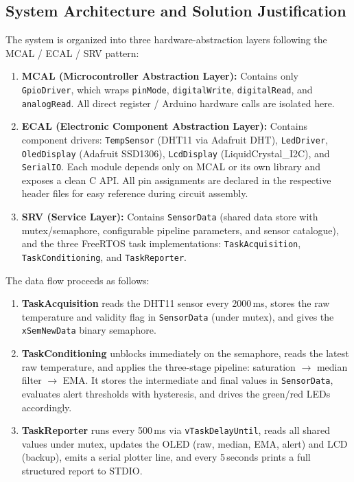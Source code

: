 \subsection{System Architecture and Solution Justification}

The system is organized into three hardware-abstraction layers following the MCAL /
ECAL / SRV pattern:

\begin{enumerate}
  \item \textbf{MCAL (Microcontroller Abstraction Layer):} Contains only
    \texttt{GpioDriver}, which wraps \texttt{pinMode}, \texttt{digitalWrite},
    \texttt{digitalRead}, and \texttt{analogRead}. All direct register / Arduino
    hardware calls are isolated here.
  \item \textbf{ECAL (Electronic Component Abstraction Layer):} Contains component
    drivers: \texttt{TempSensor} (DHT11 via Adafruit DHT), \texttt{LedDriver},
    \texttt{OledDisplay} (Adafruit SSD1306), \texttt{LcdDisplay}
    (LiquidCrystal\_I2C), and \texttt{SerialIO}. Each module depends only on MCAL
    or its own library and exposes a clean C API. All pin assignments are declared
    in the respective header files for easy reference during circuit assembly.
  \item \textbf{SRV (Service Layer):} Contains \texttt{SensorData} (shared data store
    with mutex/semaphore, configurable pipeline parameters, and sensor catalogue),
    and the three FreeRTOS task implementations:
    \texttt{TaskAcquisition}, \texttt{TaskConditioning}, and \texttt{TaskReporter}.
\end{enumerate}

The data flow proceeds as follows:
\begin{enumerate}
  \item \textbf{TaskAcquisition} reads the DHT11 sensor every 2000\,ms, stores the
    raw temperature and validity flag in \texttt{SensorData} (under mutex), and gives
    the \texttt{xSemNewData} binary semaphore.
  \item \textbf{TaskConditioning} unblocks immediately on the semaphore, reads the
    latest raw temperature, and applies the three-stage pipeline: saturation $\to$
    median filter $\to$ EMA. It stores the intermediate and final values in
    \texttt{SensorData}, evaluates alert thresholds with hysteresis, and drives the
    green/red LEDs accordingly.
  \item \textbf{TaskReporter} runs every 500\,ms via \texttt{vTaskDelayUntil}, reads
    all shared values under mutex, updates the OLED (raw, median, EMA, alert) and LCD
    (backup), emits a serial plotter line, and every 5\,seconds prints a full
    structured report to STDIO.
\end{enumerate}

